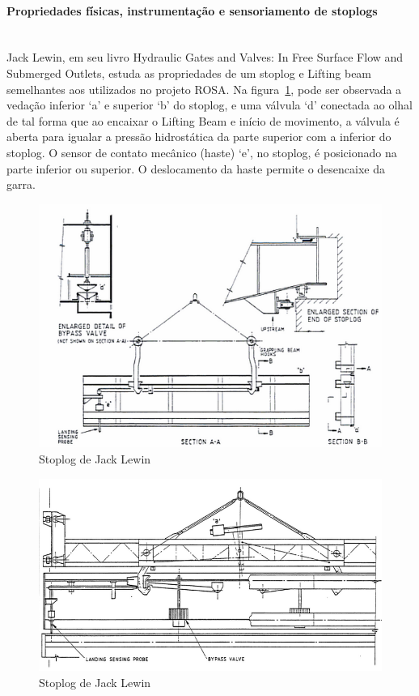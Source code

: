 \paragraph{Propriedades físicas, instrumentação e sensoriamento de
stoplogs}\mbox{}\\ Jack Lewin, em seu livro Hydraulic Gates and Valves: In Free Surface Flow and Submerged Outlets, estuda as propriedades de um stoplog e Lifting beam semelhantes aos utilizados no projeto ROSA. 
Na figura~\ref{pesqbib_7}, pode ser observada a vedação inferior ‘a’ e superior
‘b’ do stoplog, e uma válvula ‘d’ conectada ao olhal de tal forma que ao encaixar o Lifting Beam e início de movimento, a válvula é aberta para igualar a pressão hidrostática da parte superior com a inferior do stoplog. O sensor de contato mecânico (haste) ‘e’, no stoplog, é posicionado na parte inferior ou superior. O deslocamento da haste permite o desencaixe da garra.

\begin{figure}[H]
    \centering
    \includegraphics[width=1\columnwidth]{figs/pesqbib/7.png}
    \caption{Stoplog de Jack Lewin}
    \label{pesqbib_7}
\end{figure} 

\begin{figure}[H]
    \centering
    \includegraphics[width=1\columnwidth]{figs/pesqbib/8.png}
    \caption{Stoplog de Jack Lewin}
    \label{pesqbib_8}
\end{figure}  
 

